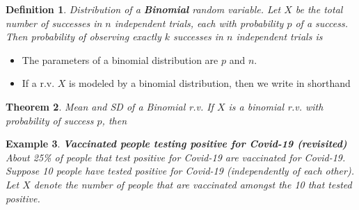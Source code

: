 \documentclass[12pt]{amsart}
\newtheorem{theorem}{Theorem}[section]
\newtheorem{definition}[theorem]{Definition}
\newtheorem{example}[theorem]{Example}
\begin{document}
{%
\vspace{.5cm}

\begin{definition}{Distribution of a \textbf{Binomial} random variable.} \newline
Let $X$ be the total number of successes in $n$ independent trials, each with probability $p$ of a success. \newline
Then probability of observing exactly $k$ successes in $n$ independent trials is 
\vspace{3cm}
\end{definition}


\begin{itemize}
\item The parameters of a binomial distribution are $p$ and $n$. 
\item If a r.v. $X$ is modeled by a binomial distribution, then we write in shorthand


\end{itemize}



\newpage
\begin{theorem}{Mean and SD of a Binomial r.v.} \newline
If $X$ is a binomial r.v. with probability of success $p$, then 


\vspace{5cm}


\end{theorem}





\newpage
\begin{example}\label{VaccBinom10}  \textbf{Vaccinated people testing positive for Covid-19 (revisited)} \newline
About 25\% of people that test positive for Covid-19 are vaccinated for Covid-19.\newline
Suppose 10 people have tested positive for Covid-19 (independently of each other). \newline
Let $X$ denote the number of people that are vaccinated amongst the 10 that tested positive.


\end{example}}
\end{document}
